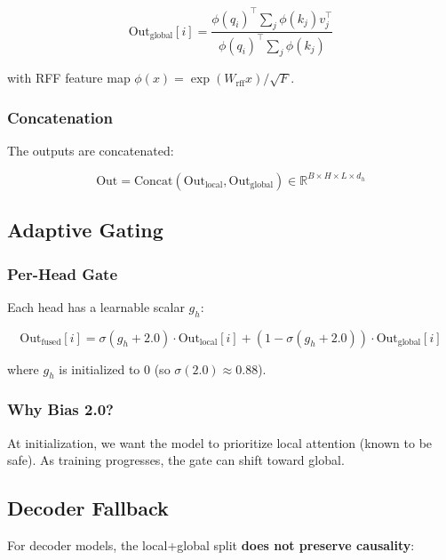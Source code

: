 \begin{equation}
\text{Out}_\text{global}[i] = \frac{\phi(q_i)^\top \sum_j \phi(k_j) v_j^\top}{\phi(q_i)^\top \sum_j \phi(k_j)}
\end{equation}

with RFF feature map $\phi(x) = \exp(W_\text{rff} x) / \sqrt{F}$.

\subsubsection{Concatenation}

The outputs are concatenated:

\begin{equation}
\text{Out} = \text{Concat}(\text{Out}_\text{local}, \text{Out}_\text{global}) \in \mathbb{R}^{B \times H \times L \times d_h}
\end{equation}

\subsection{Adaptive Gating}

\subsubsection{Per-Head Gate}

Each head has a learnable scalar $g_h$:

\begin{equation}
\text{Out}_\text{fused}[i] = \sigma(g_h + 2.0) \cdot \text{Out}_\text{local}[i] + (1 - \sigma(g_h + 2.0)) \cdot \text{Out}_\text{global}[i]
\end{equation}

where $g_h$ is initialized to 0 (so $\sigma(2.0) \approx 0.88$).

\subsubsection{Why Bias 2.0?}

At initialization, we want the model to prioritize local attention (known 
to be safe). As training progresses, the gate can shift toward global.

\subsection{Decoder Fallback}

For decoder models, the local+global split \textbf{does not preserve causality}:

